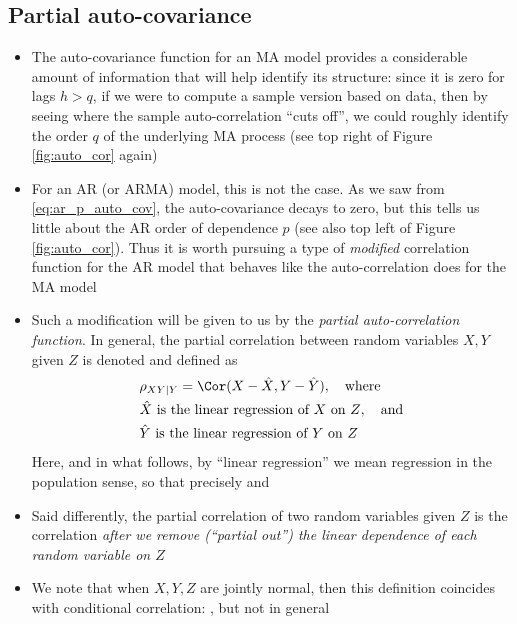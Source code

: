 \documentclass{article}
\begin{document}
\subsection{Partial auto-covariance}

\begin{itemize}
\item The auto-covariance function for an MA model provides a considerable
  amount of information that will help identify its structure: since it is zero
  for lags $h>q$, if we were to compute a sample version based on data, then by
  seeing where the sample auto-correlation ``cuts off'', we could roughly
  identify the order $q$ of the underlying MA process (see top right of Figure 
  \ref{fig:auto_cor} again)   

\item For an AR (or ARMA) model, this is not the case. As we saw from
  \eqref{eq:ar_p_auto_cov}, the auto-covariance decays to zero, but this tells
  us little about the AR order of dependence $p$ (see also top left of Figure 
  \ref{fig:auto_cor}). Thus it is worth pursuing a type of \emph{modified}
  correlation function for the AR model that behaves like the auto-correlation
  does for the MA model 

\item Such a modification will be given to us by the \emph{partial
    auto-correlation function}. In general, the partial correlation between
  random variables $X,Y$ given $Z$ is denoted  and defined
  as    
  \begin{align*}
  &\rho_{XY|Y} = \Cor(X - \hat{X}, Y - \hat{Y}), \quad \text{where} \\
  &\text{$\hat{X}$ is the linear regression of $X$ on $Z$}, \quad \text{and} \\
  &\text{$\hat{Y}$ is the linear regression of $Y$ on $Z$}
  \end{align*}
  Here, and in what follows, by ``linear regression'' we mean regression in the
  population sense, so that precisely  and    

\item Said differently, the partial correlation of two random variables given
  $Z$ is the correlation \emph{after we remove (``partial out'') the linear
    dependence of each random variable on $Z$}     

\item We note that when $X,Y,Z$ are jointly normal, then this definition
  coincides with conditional correlation: ,
  but not in general 


\end{itemize}
\end{document}
